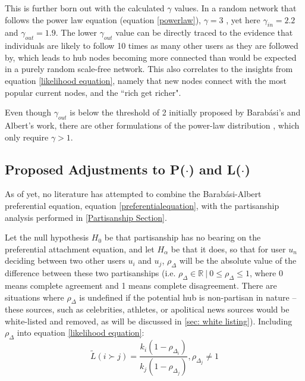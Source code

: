 \documentclass[preprint,review,12pt]{elsarticle}
\begin{document}
This is further born out with the calculated $\gamma$ values. In a random network that follows the power law equation (equation \ref{powerlaw}), $\gamma = 3$ \cite{barabasi2000scale,pastor2001epidemic}, yet here $\gamma_{in} = 2.2$ and $\gamma_{out} = 1.9$. The lower $\gamma_{out}$ value can be directly traced to the evidence that individuals are likely to follow 10 times as many other users as they are followed by, which leads to hub nodes becoming more connected than would be expected in a purely random scale-free network. This also correlates to the insights from equation \ref{likelihood equation}, namely that new nodes connect with the most popular current nodes, and the ``rich get richer".

Even though $\gamma_{out}$ is below the threshold of 2 initially proposed by Barab{\'a}si's and Albert's work, there are other formulations of the power-law distribution \cite{ichinose2017invasion,albert1999diameter,mislove2007measurement,zhang2015exactly,pastor2002epidemic}, which only require $\gamma > 1$. 

\subsection{Proposed Adjustments to P($\cdot$) and L($\cdot$)}
As of yet, no literature has attempted to combine the Barab{\'a}si-Albert preferential equation, equation \ref{preferentialequation}, with the partisanship analysis performed in \ref{Partisanship Section}.

Let the null hypothesis $H_0$ be that partisanship has no bearing on the preferential attachment equation, and let $H_\alpha$ be that it does, so that for user $u_n$ deciding between two other users $u_i$ and $u_j$, $\rho_{\Delta}$ will be the absolute value of the difference between these two partisanships (i.e. $\rho_{\Delta} \in \mathbb{R} \ |\  0 \leq \rho_{\Delta} \leq 1$, where 0 means complete agreement and 1 means complete disagreement. There are situations where $\rho_{\Delta}$ is undefined if the potential hub is non-partisan in nature -- these sources, such as celebrities, athletes, or apolitical news sources would be white-listed and removed, as will be discussed in \ref{sec: white listing}). Including $\rho_\Delta$ into equation
\ref{likelihood equation}:
\begin{equation}
\label{Ldotpartisan}
        \tilde{L}(i \succ j)=\frac{k_i(1-\rho_{\Delta_i})}{k_j(1-\rho_{\Delta_j})},\rho_{\Delta_j}\neq 1 
\end{equation}
\end{document}
